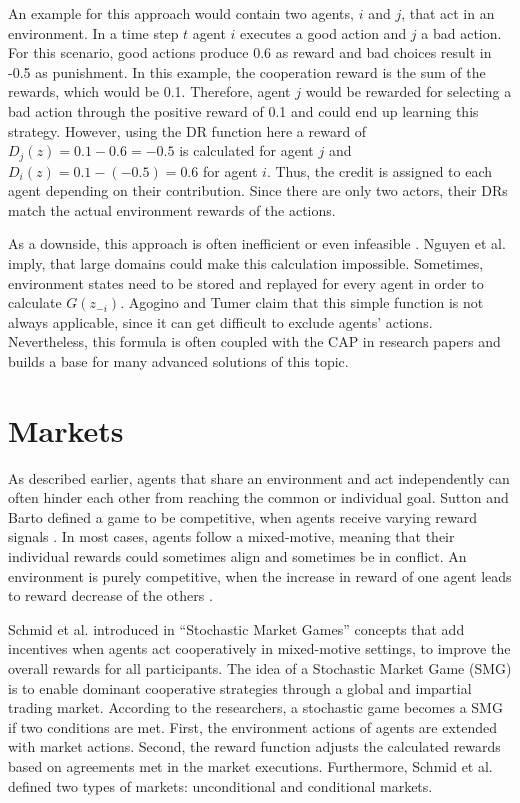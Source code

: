 An example for this approach would contain two agents, $i$ and $j$, that act in an environment. In a time step $t$ agent $i$ executes a good action and $j$ a bad action. For this scenario, good actions produce 0.6 as reward and bad choices result in -0.5 as punishment. In this example, the cooperation reward is the sum of the rewards, which would be 0.1. Therefore, agent $j$ would be rewarded for selecting a bad action through the positive reward of 0.1 and could end up learning this strategy. However, using the DR function here a reward of $D_j(z) = 0.1 - 0.6 = -0.5$ is calculated for agent $j$ and $D_i(z) = 0.1 - (-0.5) = 0.6$ for agent $i$. Thus, the credit is assigned to each agent depending on their contribution. Since there are only two actors, their DRs match the actual environment rewards of the actions.

As a downside, this approach is often inefficient or even infeasible \cite{ngku18}. Nguyen et al. \cite{ngku18} imply, that large domains could make this calculation impossible. Sometimes, environment states need to be stored and replayed for every agent in order to calculate $G(z_{-i})$. Agogino and Tumer \cite{agtu04} claim that this simple function is not always applicable, since it can get difficult to exclude agents' actions. Nevertheless, this formula is often coupled with the CAP in research papers and builds a base for many advanced solutions of this topic.

\section{Markets}\label{market}
As described earlier, agents that share an environment and act independently can often hinder each other from reaching the common or individual goal. Sutton and Barto defined a game to be competitive, when agents receive varying reward signals \cite{suba18}. In most cases, agents follow a mixed-motive, meaning that their individual rewards could sometimes align and sometimes be in conflict. An environment is purely competitive, when the increase in reward of one agent leads to reward decrease of the others \cite{scbe21}.

Schmid et al. introduced in ``Stochastic Market Games'' \cite{scbe21} concepts that add incentives when agents act cooperatively in mixed-motive settings, to improve the overall rewards for all participants. The idea of a Stochastic Market Game (SMG) is to enable dominant cooperative strategies through a global and impartial trading market. According to the researchers, a stochastic game becomes a SMG if two conditions are met. First, the environment actions of agents are extended with market actions. Second, the reward function adjusts the calculated rewards based on agreements met in the market executions. Furthermore, Schmid et al. defined two types of markets: unconditional and conditional markets.

